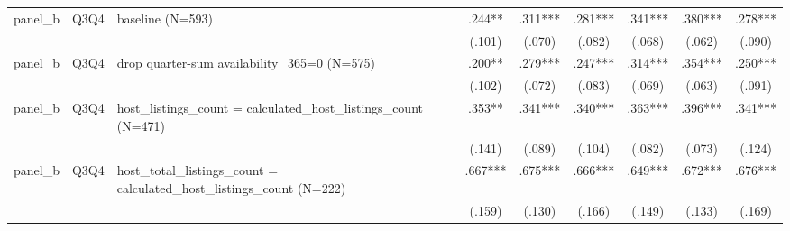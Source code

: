 \begin{tabular}{lllcccccc}
panel\_b & Q3Q4 & baseline (N=593) & .244** & .311*** & .281*** & .341*** & .380*** & .278***
\\
 &  &  & (.101) & (.070) & (.082) & (.068) & (.062) & (.090)
\\
panel\_b & Q3Q4 & drop quarter-sum availability\_365=0 (N=575) & .200** & .279*** & .247*** & .314*** & .354*** & .250***
\\
 &  &  & (.102) & (.072) & (.083) & (.069) & (.063) & (.091)
\\
panel\_b & Q3Q4 & host\_listings\_count = calculated\_host\_listings\_count (N=471) & .353** & .341*** & .340*** & .363*** & .396*** & .341***
\\
 &  &  & (.141) & (.089) & (.104) & (.082) & (.073) & (.124)
\\
panel\_b & Q3Q4 & host\_total\_listings\_count = calculated\_host\_listings\_count (N=222) & .667*** & .675*** & .666*** & .649*** & .672*** & .676***
\\
 &  &  & (.159) & (.130) & (.166) & (.149) & (.133) & (.169)
\\
\hline
\end{tabular}
